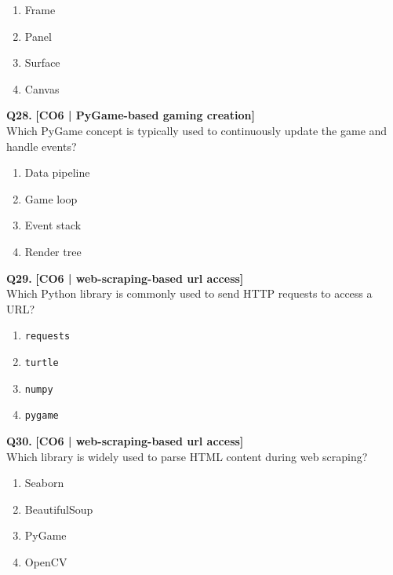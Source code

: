 \begin{enumerate}[label=(\alph*),topsep=2pt,itemsep=1pt,partopsep=0pt,parsep=0pt]
    \item \relax Frame
    \item \relax Panel
    \item \relax Surface
    \item \relax Canvas
\end{enumerate}
\vspace{{2mm}}

\noindent\textbf{Q28.} \hfill {\small\color{LPUOrange}\textbf{[CO6 | PyGame-based gaming creation]}}\\[2pt]
Which PyGame concept is typically used to continuously update the game and handle events?

\begin{enumerate}[label=(\alph*),topsep=2pt,itemsep=1pt,partopsep=0pt,parsep=0pt]
    \item \relax Data pipeline
    \item \relax Game loop
    \item \relax Event stack
    \item \relax Render tree
\end{enumerate}
\vspace{{2mm}}

\noindent\textbf{Q29.} \hfill {\small\color{LPUOrange}\textbf{[CO6 | web-scraping-based url access]}}\\[2pt]
Which Python library is commonly used to send HTTP requests to access a URL?

\begin{enumerate}[label=(\alph*),topsep=2pt,itemsep=1pt,partopsep=0pt,parsep=0pt]
    \item \relax \texttt{requests}
    \item \relax \texttt{turtle}
    \item \relax \texttt{numpy}
    \item \relax \texttt{pygame}
\end{enumerate}
\vspace{{2mm}}

\noindent\textbf{Q30.} \hfill {\small\color{LPUOrange}\textbf{[CO6 | web-scraping-based url access]}}\\[2pt]
Which library is widely used to parse HTML content during web scraping?

\begin{enumerate}[label=(\alph*),topsep=2pt,itemsep=1pt,partopsep=0pt,parsep=0pt]
    \item \relax Seaborn
    \item \relax BeautifulSoup
    \item \relax PyGame
    \item \relax OpenCV
\end{enumerate}
\vspace{{2mm}}

